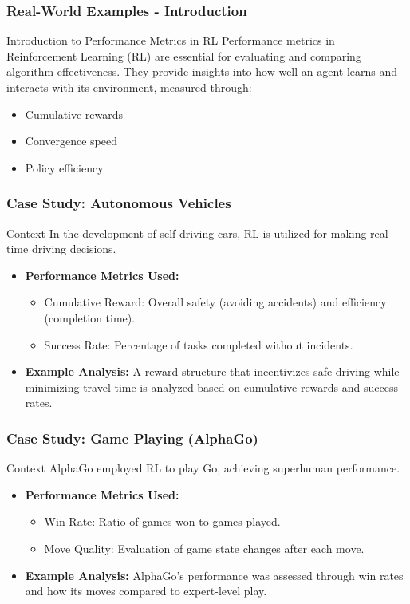 \documentclass[aspectratio=169]{beamer}
\begin{document}
\begin{frame}[fragile]
    \frametitle{Real-World Examples - Introduction}
    \begin{block}{Introduction to Performance Metrics in RL}
        Performance metrics in Reinforcement Learning (RL) are essential for evaluating and comparing algorithm effectiveness. 
        They provide insights into how well an agent learns and interacts with its environment, measured through:
        \begin{itemize}
            \item Cumulative rewards
            \item Convergence speed
            \item Policy efficiency
        \end{itemize}
    \end{block}
\end{frame}

\begin{frame}[fragile]
    \frametitle{Case Study: Autonomous Vehicles}
    \begin{block}{Context}
        In the development of self-driving cars, RL is utilized for making real-time driving decisions.
    \end{block}
    \begin{itemize}
        \item \textbf{Performance Metrics Used:}
        \begin{itemize}
            \item Cumulative Reward: Overall safety (avoiding accidents) and efficiency (completion time).
            \item Success Rate: Percentage of tasks completed without incidents.
        \end{itemize}
        \item \textbf{Example Analysis:} 
        A reward structure that incentivizes safe driving while minimizing travel time is analyzed based on cumulative rewards and success rates.
    \end{itemize}
\end{frame}

\begin{frame}[fragile]
    \frametitle{Case Study: Game Playing (AlphaGo)}
    \begin{block}{Context}
        AlphaGo employed RL to play Go, achieving superhuman performance.
    \end{block}
    \begin{itemize}
        \item \textbf{Performance Metrics Used:}
        \begin{itemize}
            \item Win Rate: Ratio of games won to games played.
            \item Move Quality: Evaluation of game state changes after each move.
        \end{itemize}
        \item \textbf{Example Analysis:} 
        AlphaGo's performance was assessed through win rates and how its moves compared to expert-level play.
    \end{itemize}
\end{frame}
\end{document}
